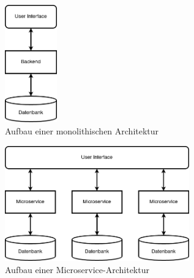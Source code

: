 \begin{figure}[H] 
    \centering
    \includegraphics[width=0.2\textwidth]{figures/Monolith.png}
    \caption{Aufbau einer monolithischen Architektur}
\end{figure}
\begin{figure}[H] 
    \centering
    \includegraphics[width=0.71\textwidth]{figures/Microservices.png}
    \caption{Aufbau einer Microservice-Architektur}
\end{figure}

